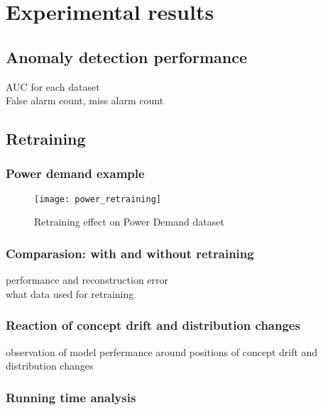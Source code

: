 \chapter{Experimental results}
\label{chap:results}


\section{Anomaly detection performance}
\label{sec:performance}

AUC for each dataset\\
False alarm count, miss alarm count

\section{Retraining}
\label{sec:retraining}

\subsection{Power demand example}
\label{sec:example}

\begin{figure}[h]
\centering
\texttt{[image: power\_retraining]}
\caption[Retraining effect on Power Demand dataset]{Retraining effect on Power Demand dataset}
\label{fig:power_retraining}
\end{figure}



\subsection{Comparasion: with and without retraining}
\label{sec: compare}

performance and reconstruction error\\
what data used for retraining


\subsection{Reaction of concept drift and distribution changes}
\label{sec:reaction}
observation of model perfermance around positions of concept drift and distribution changes 

\subsection{Running time analysis}
\label{sec:time}




